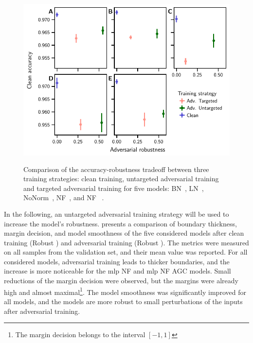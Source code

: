 \documentclass[../main.tex]{subfiles}
\begin{document}
		\begin{figure}[htbp]
			\centering
			\begin{subcaptiongroup}
				\includegraphics{adversarial_robustness_strategy.pdf}
				\label{fig:adv_robust_strat_mlp_bn}
				\label{fig:adv_robust_strat_mlp_ln}
				\label{fig:adv_robust_strat_mlp_nonorm}
				\label{fig:adv_robust_strat_mlp_fn}
				\label{fig:adv_robust_strat_mlp_fn_agc}
			\end{subcaptiongroup}
			\caption[Comparison of the accuracy-robustness tradeoff with various training strategies]{Comparison of the accuracy-robustness tradeoff between three training strategies: clean training, untargeted adversarial training and targeted adversarial training for five models:  BN~,  LN~,  NoNorm~,  NF~, and  NF ~.}\label{fig:adv_robust_strat}
		\end{figure}

		In the following, an untargeted adversarial training strategy will be used to increase the model's robustness.
		 presents a comparison of boundary thickness, margin decision, and model smoothness of the five considered models after clean training (Robust \xmark) and adversarial training (Robust \cmark).
		The metrics were measured on all samples from the validation set, and their mean value was reported.
		For all considered models, adversarial training leads to thicker boundaries, and the increase is more noticeable for the \gls{mlp} NF and \gls{mlp} NF AGC models.
		Small reductions of the margin decision were observed, but the margins were already high and almost maximal\footnote{The margin decision belongs to the interval \(\left[-1, 1\right]\)}.
		The model smoothness was significantly improved for all models, and the models are more robust to small perturbations of the inputs after adversarial training.
\end{document}
